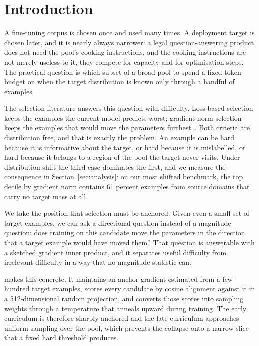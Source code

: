 \section{Introduction}
\label{sec:introduction}

A fine-tuning corpus is chosen once and used many times. A deployment target is
chosen later, and it is nearly always narrower: a legal question-answering
product does not need the pool's cooking instructions, and the cooking
instructions are not merely useless to it, they compete for capacity and for
optimisation steps. The practical question is which subset of a broad pool to
spend a fixed token budget on when the target distribution is known only
through a handful of examples.

The selection literature answers this question with difficulty. Loss-based
selection keeps the examples the current model predicts worst; gradient-norm
selection keeps the examples that would move the parameters
furthest~\citep{arbogast2021gradnorm}. Both criteria are distribution free, and
that is exactly the problem. An example can be hard because it is informative
about the target, or hard because it is mislabelled, or hard because it belongs
to a region of the pool the target never visits. Under distribution shift the
third case dominates the first, and we measure the consequence in
Section~\ref{sec:analysis}: on our most shifted benchmark, the top decile by
gradient norm contains 61 percent examples from source domains that carry no
target mass at all.

We take the position that selection must be anchored. Given even a small set of
target examples, we can ask a directional question instead of a magnitude
question: does training on this candidate move the parameters in the direction
that a target example would have moved them? That question is answerable with a
sketched gradient inner product, and it separates useful difficulty from
irrelevant difficulty in a way that no magnitude statistic can.

\method{} makes this concrete. It maintains an anchor gradient estimated from a
few hundred target examples, scores every candidate by cosine alignment against
it in a 512-dimensional random projection, and converts those scores into
sampling weights through a temperature that anneals upward during training. The
early curriculum is therefore sharply anchored and the late curriculum
approaches uniform sampling over the pool, which prevents the collapse onto a
narrow slice that a fixed hard threshold produces.


